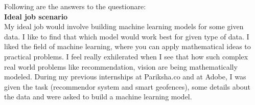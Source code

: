 Following are the answers to the questionare: \\ 
\textbf{Ideal job scenario} \\
My ideal job would involve building machine learning models for some given data. I like to find that which model would work best for given type of data. I liked the field of machine learning, where you can apply mathematical ideas to practical problems. I feel really exhilerated when I see that how such complex real world problems like recommendation, vision are being mathematically modeled. During my previous internships at Pariksha.co and at Adobe, I was given the task (recommendor system and smart geofences), some details about the data and were asked to build a machine learning model. 



